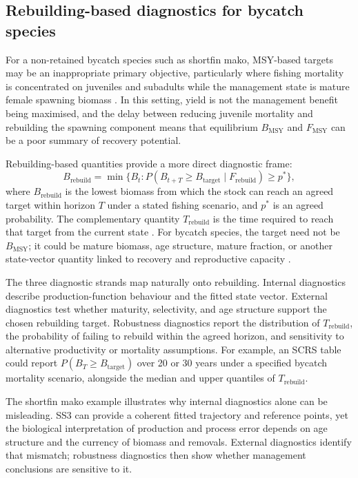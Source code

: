 \documentclass[11pt,a4paper]{article}
\begin{document}
\subsection{Rebuilding-based diagnostics for bycatch species}

For a non-retained bycatch species such as shortfin mako, MSY-based targets may be an inappropriate primary objective, particularly where fishing mortality is concentrated on juveniles and subadults while the management state is mature female spawning biomass \citep{winker2020age,Winker2025assessing}. In this setting, yield is not the management benefit being maximised, and the delay between reducing juvenile mortality and rebuilding the spawning component means that equilibrium $B_{\mathrm{MSY}}$ and $F_{\mathrm{MSY}}$ can be a poor summary of recovery potential.

Rebuilding-based quantities provide a more direct diagnostic frame:
\[
B_{\mathrm{rebuild}} = \min\{B_t : P(B_{t+T} \ge B_{\mathrm{target}} \mid F_{\mathrm{rebuild}}) \ge p^\ast\},
\]
where \(B_{\mathrm{rebuild}}\) is the lowest biomass from which the stock can reach an agreed target within horizon \(T\) under a stated fishing scenario, and \(p^\ast\) is an agreed probability. The complementary quantity \(T_{\mathrm{rebuild}}\) is the time required to reach that target from the current state \citep{kell2026rebuild}. For bycatch species, the target need not be \(B_{\mathrm{MSY}}\); it could be mature biomass, age structure, mature fraction, or another state-vector quantity linked to recovery and reproductive capacity \citep{griffiths2024including}.

The three diagnostic strands map naturally onto rebuilding. Internal diagnostics describe production-function behaviour and the fitted state vector. External diagnostics test whether maturity, selectivity, and age structure support the chosen rebuilding target. Robustness diagnostics report the distribution of \(T_{\mathrm{rebuild}}\), the probability of failing to rebuild within the agreed horizon, and sensitivity to alternative productivity or mortality assumptions. For example, an SCRS table could report \(P(B_T \ge B_{\mathrm{target}})\) over 20 or 30 years under a specified bycatch mortality scenario, alongside the median and upper quantiles of \(T_{\mathrm{rebuild}}\).

The shortfin mako example illustrates why internal diagnostics alone can be misleading. SS3 can provide a coherent fitted trajectory and reference points, yet the biological interpretation of production and process error depends on age structure and the currency of biomass and removals. External diagnostics identify that mismatch; robustness diagnostics then show whether management conclusions are sensitive to it.
\end{document}
